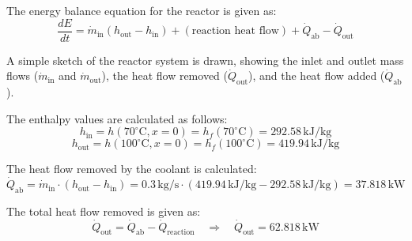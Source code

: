 The energy balance equation for the reactor is given as:  
\[
\frac{dE}{dt} = \dot{m}_{\text{in}} (h_{\text{out}} - h_{\text{in}}) + (\text{reaction heat flow}) + \dot{Q}_{\text{ab}} - \dot{Q}_{\text{out}}
\]  

A simple sketch of the reactor system is drawn, showing the inlet and outlet mass flows (\( \dot{m}_{\text{in}} \) and \( \dot{m}_{\text{out}} \)), the heat flow removed (\( \dot{Q}_{\text{out}} \)), and the heat flow added (\( \dot{Q}_{\text{ab}} \)).  

The enthalpy values are calculated as follows:  
\[
h_{\text{in}} = h(70^\circ\text{C}, x = 0) = h_f(70^\circ\text{C}) = 292.58 \, \text{kJ/kg}
\]  
\[
h_{\text{out}} = h(100^\circ\text{C}, x = 0) = h_f(100^\circ\text{C}) = 419.94 \, \text{kJ/kg}
\]  

The heat flow removed by the coolant is calculated:  
\[
\dot{Q}_{\text{ab}} = \dot{m}_{\text{in}} \cdot (h_{\text{out}} - h_{\text{in}}) = 0.3 \, \text{kg/s} \cdot (419.94 \, \text{kJ/kg} - 292.58 \, \text{kJ/kg}) = 37.818 \, \text{kW}
\]  

The total heat flow removed is given as:  
\[
\dot{Q}_{\text{out}} = \dot{Q}_{\text{ab}} - \dot{Q}_{\text{reaction}} \quad \Rightarrow \quad \dot{Q}_{\text{out}} = 62.818 \, \text{kW}
\]